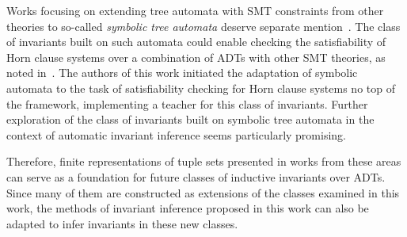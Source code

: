 Works focusing on extending tree automata with SMT constraints from other theories to so-called \emph{symbolic tree automata} deserve separate mention~\cite{VEANES2015418,10.1145/2933575.2933578}. The class of invariants built on such automata could enable checking the satisfiability of Horn clause systems over a combination of ADTs with other SMT theories, as noted in~\cite{10.1007/978-3-031-13188-2_13}. The authors of this work initiated the adaptation of symbolic automata to the task of satisfiability checking for Horn clause systems no top of the \ice{} framework, implementing a teacher for this class of invariants. Further exploration of the class of invariants built on symbolic tree automata in the context of automatic invariant inference seems particularly promising.

Therefore, finite representations of tuple sets presented in works from these areas can serve as a foundation for future classes of inductive invariants over ADTs. Since many of them are constructed as extensions of the classes examined in this work, the methods of invariant inference proposed in this work can also be adapted to infer invariants in these new classes.

